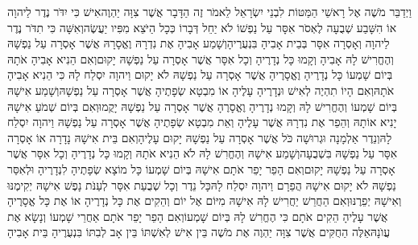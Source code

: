 \documentclass[../main/main.tex]{subfiles}
\begin{document}
\begin{multicols}{\ncols}
וַיְדַבֵּר מֹשֶׁה אֶל רָאשֵׁי הַמַּטּוֹת לִבְנֵי יִשְׂרָאֵל לֵאמֹר זֶה הַדָּבָר אֲשֶׁר צִוָּה יַהְוֶה\PreVerseSpace{}אִישׁ כִּי יִדֹּר נֶדֶר לַיהוָה אוֹ הִשָּׁבַע שְׁבֻעָה לֶאְסֹר אִסָּר עַל נַפְשׁוֹ לֹא יַחֵל דְּבָרוֹ כְּכָל הַיֹּצֵא מִפִּיו יַעֲשֶׂה\PreVerseSpace{}וְאִשָּׁה כִּי תִדֹּר נֶדֶר לַיהוָה וְאָסְרָה אִסָּר בְּבֵית אָבִיהָ בִּנְעֻרֶיהָ\PreVerseSpace{}וְשָׁמַע אָבִיהָ אֶת נִדְרָהּ וֶאֱסָרָהּ אֲשֶׁר אָסְרָה עַל נַפְשָׁהּ וְהֶחֱרִישׁ לָהּ אָבִיהָ וְקָמוּ כָּל נְדָרֶיהָ וְכָל אִסָּר אֲשֶׁר אָסְרָה עַל נַפְשָׁהּ יָקוּם\PreVerseSpace{}וְאִם הֵנִיא אָבִיהָ אֹתָהּ בְּיוֹם שָׁמְעוֹ כָּל נְדָרֶיהָ וֶאֱסָרֶיהָ אֲשֶׁר אָסְרָה עַל נַפְשָׁהּ לֹא יָקוּם וַיהוָה יִסְלַח לָהּ כִּי הֵנִיא אָבִיהָ אֹתָהּ\PreVerseSpace{}וְאִם הָיוֹ תִהְיֶה לְאִישׁ וּנְדָרֶיהָ עָלֶיהָ אוֹ מִבְטָא שְׂפָתֶיהָ אֲשֶׁר אָסְרָה עַל נַפְשָׁהּ\PreVerseSpace{}וְשָׁמַע אִישָׁהּ בְּיוֹם שָׁמְעוֹ וְהֶחֱרִישׁ לָהּ וְקָמוּ נְדָרֶיהָ וֶאֱסָרֶהָ אֲשֶׁר אָסְרָה עַל נַפְשָׁהּ יָקֻמוּ\PreVerseSpace{}וְאִם בְּיוֹם שְׁמֹעַ אִישָׁהּ יָנִיא אוֹתָהּ וְהֵפֵר אֶת נִדְרָהּ אֲשֶׁר עָלֶיהָ וְאֵת מִבְטָא שְׂפָתֶיהָ אֲשֶׁר אָסְרָה עַל נַפְשָׁהּ וַיהוָה יִסְלַח לָהּ\PreVerseSpace{}וְנֵדֶר אַלְמָנָה וּגְרוּשָׁה כֹּל אֲשֶׁר אָסְרָה עַל נַפְשָׁהּ יָקוּם עָלֶיהָ\PreVerseSpace{}וְאִם בֵּית אִישָׁהּ נָדָרָה אוֹ אָסְרָה אִסָּר עַל נַפְשָׁהּ בִּשְׁבֻעָה\PreVerseSpace{}וְשָׁמַע אִישָׁהּ וְהֶחֱרִשׁ לָהּ לֹא הֵנִיא אֹתָהּ וְקָמוּ כָּל נְדָרֶיהָ וְכָל אִסָּר אֲשֶׁר אָסְרָה עַל נַפְשָׁהּ יָקוּם\PreVerseSpace{}וְאִם הָפֵר יָפֵר אֹתָם אִישָׁהּ בְּיוֹם שָׁמְעוֹ כָּל מוֹצָא שְׂפָתֶיהָ לִנְדָרֶיהָ וּלְאִסַּר נַפְשָׁהּ לֹא יָקוּם אִישָׁהּ הֲפֵרָם וַיהוָה יִסְלַח לָהּ\PreVerseSpace{}כָּל נֵדֶר וְכָל שְׁבֻעַת אִסָּר לְעַנֹּת נָפֶשׁ אִישָׁהּ יְקִימֶנּוּ וְאִישָׁהּ יְפֵרֶנּוּ\PreVerseSpace{}וְאִם הַחֲרֵשׁ יַחֲרִישׁ לָהּ אִישָׁהּ מִיּוֹם אֶל יוֹם וְהֵקִים אֶת כָּל נְדָרֶיהָ אוֹ אֶת כָּל אֱסָרֶיהָ אֲשֶׁר עָלֶיהָ הֵקִים אֹתָם כִּי הֶחֱרִשׁ לָהּ בְּיוֹם שָׁמְעוֹ\PreVerseSpace{}וְאִם הָפֵר יָפֵר אֹתָם אַחֲרֵי שָׁמְעוֹ וְנָשָׂא אֶת עֲוֺנָהּ\PreVerseSpace{}אֵלֶּה הַחֻקִּים אֲשֶׁר צִוָּה יַהְוֶה אֶת מֹשֶׁה בֵּין אִישׁ לְאִשְׁתּוֹ בֵּין אָב לְבִתּוֹ בִּנְעֻרֶיהָ בֵּית אָבִיהָ\OpenSection{}\par

\end{multicols}
\end{document}

